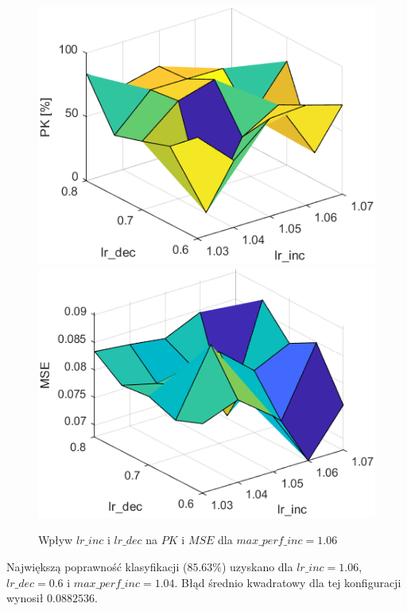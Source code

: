 \begin{figure}[!htb]
  \includegraphics[width = \linewidth]{Grafika/exp5/pk106.png}
\endminipage\hfill
{}
  \includegraphics[width = \linewidth]{Grafika/exp5/mse106.png}
\endminipage\hfill
\caption{Wpływ $lr\_inc$ i $lr\_dec$ na $PK$ i $MSE$ dla $max\_perf\_inc=1.06$}
\end{figure}

Największą poprawność klasyfikacji ($85.63\%$) uzyskano dla $lr\_inc = 1.06$, $lr\_dec = 0.6$ i $max\_perf\_inc=1.04$. Błąd średnio kwadratowy dla tej konfiguracji wynosił $0.0882536$.